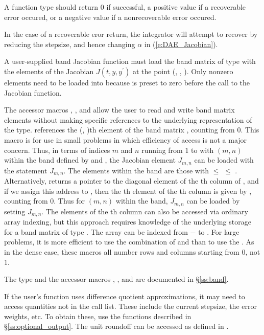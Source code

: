 {
  A  function type should return $0$ if successful,
  a positive value if a recoverable error occured, or a negative value
  if a nonrecoverable error occured. 

  In the case of a recoverable eror return, 
  the integrator will attempt to recover by reducing the stepsize,
  and hence changing $\alpha$ in (\ref{e:DAE_Jacobian}).
}
{
  A user-supplied band Jacobian function must load the band matrix 
  of type  with the elements of the Jacobian $J(t,y,y^\prime)$ at the
  point (, , ).  Only nonzero elements need to be loaded into
   because  is preset to zero before the call to the
  Jacobian function.  

  The accessor macros , , and  
  allow the user to read and write band matrix elements without making specific 
  references to the underlying representation of the  type.
   references the (, )th element of the 
  band matrix , counting from $0$.
  This macro is for use in small problems in which efficiency of access is not
  a major concern.  Thus, in terms of indices $m$ and $n$ running from $1$ to
   with $(m,n)$ within the band defined by  and
  , the Jacobian element $J_{m,n}$ can be loaded with the 
  statement  $J_{m,n}$. The elements within
  the band are those with  $\le$  $\le$ .
  Alternatively,  returns a pointer to the diagonal element
  of the th column of , and if we assign this address to 
  , then the th element of the th column is
  given by , counting from $0$.
  Thus for $(m,n)$ within the band, $J_{m,n}$ can be loaded by setting 
    $J_{m,n}$.
  The elements of the th column can also be accessed
  via ordinary array indexing, but this approach requires knowledge of
  the underlying storage for a band matrix of type .  
  The array  can be indexed from $-$ to .
  For large problems, it is more efficient to use the combination of
   and  than to use the
  .  As in the dense case, these macros all number rows
  and columns starting from $0$, not $1$.  

  The  type and the accessor macros , , and
   are documented in \S\ref{ss:band}.

  If the user's  function uses difference quotient approximations,
  it may need to access quantities not in the call list. These include the current
  stepsize, the error weights, etc. To obtain these, use the  functions 
  described in \S\ref{ss:optional_output}. The unit roundoff can be accessed
  as  defined in .

}
